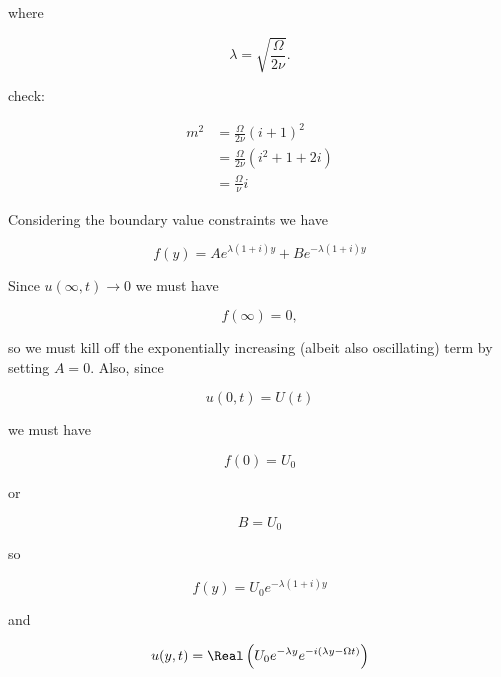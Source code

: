 where

\begin{equation}\label{eqn:continuumL17:420}
\lambda = \sqrt{\frac{\Omega}{2 \nu}}.
\end{equation}

check:

\begin{align*}
m^2 
&= 
\frac{\Omega}{2 \nu} (i + 1)^2 \\
&= 
\frac{\Omega}{2 \nu} (i^2 + 1 + 2 i) \\
&= 
\frac{\Omega}{\nu} i
\end{align*}

Considering the boundary value constraints we have

\begin{equation}\label{eqn:continuumL17:440}
f(y) = 
A e^{\lambda (1 + i) y}
+ B e^{-\lambda (1 + i) y}
\end{equation}

Since $u(\infty, t) \rightarrow 0$ we must have

\begin{equation}\label{eqn:continuumL17:460}
f(\infty) = 0,
\end{equation}

so we must kill off the exponentially increasing (albeit also oscillating) term by setting $A = 0$.  Also, since

\begin{equation}\label{eqn:continuumL17:480}
u(0, t) = U(t)
\end{equation}

we must have

\begin{equation}\label{eqn:continuumL17:500}
f(0) = U_0
\end{equation}

or 

\begin{equation}\label{eqn:continuumL17:520}
B = U_0
\end{equation}

so 

\begin{equation}\label{eqn:continuumL17:540}
f(y) = U_0 e^{-\lambda (1 + i) y}
\end{equation}

and

\begin{equation}\label{eqn:continuumL17:560}
u(y, t) = 
\Real\left(
U_0 e^{-\lambda y} e^{ -i (\lambda y - \Omega t) }
\right)
\end{equation}

